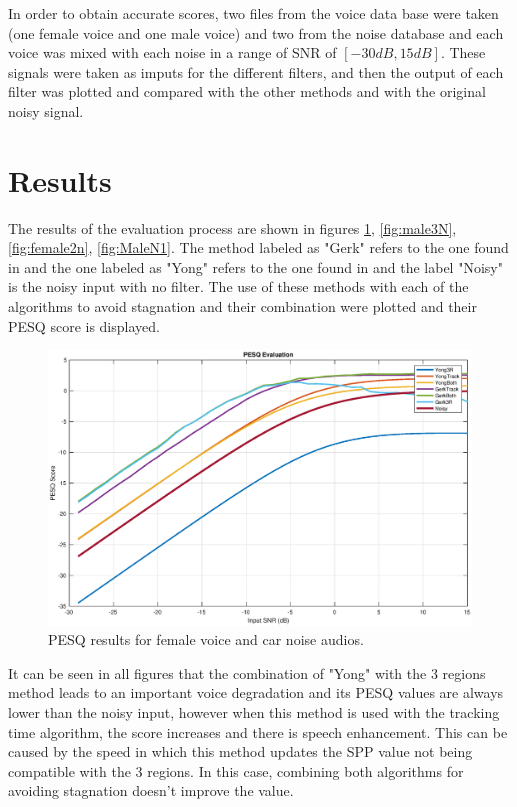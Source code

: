 In order to obtain accurate scores, two files from the voice data base were taken (one female voice and one male voice) and two from the noise database and each voice was mixed with each noise in a range of SNR of $[-30dB , 15dB]$. These signals were taken as imputs for the different filters, and then the output of each filter was plotted and compared with the other methods and with the original noisy signal. 


\section{Results}

The results of the evaluation process are shown in figures \ref{fig:female3n}, \ref{fig:male3N}, \ref{fig:female2n}, \ref{fig:MaleN1}. The method labeled as "Gerk" refers to the one found in \cite{Gerkmann2011NoisePresence} and the one labeled as "Yong" refers to the one found in \cite{SPPYONG} and the label "Noisy" is the noisy input with no filter. The use of these methods with each of the algorithms to avoid stagnation and their combination were plotted and their PESQ score is displayed. \\






\begin{figure}[!ht]
  \centering
	\includegraphics[width=130mm]{Kap4/female3n}
	\caption{PESQ results for female voice and car noise audios.}
	\label{fig:female3n}
\end{figure}

It can be seen in all figures that the combination of "Yong" with the 3 regions method leads to an important voice degradation and its PESQ values are always lower than the noisy input, however when this method is used with the tracking time algorithm, the score increases and there is speech enhancement. This can be caused by the speed in which this method updates the SPP value not being compatible with the 3 regions. In this case, combining both algorithms for avoiding stagnation doesn't improve the value. \\

